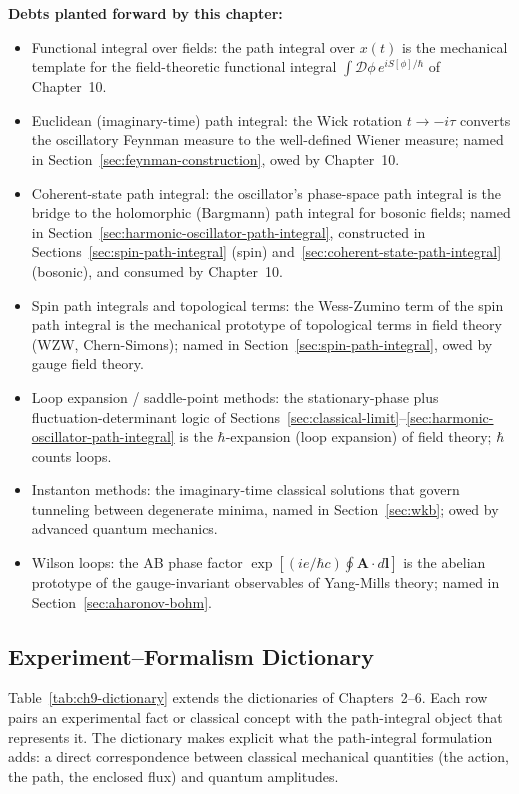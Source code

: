 \medskip\noindent\textbf{Debts planted forward by this chapter:}
\begin{itemize}
\item Functional integral over fields: the path integral over $x(t)$ is the mechanical template for the field-theoretic functional integral $\int\mathcal{D}\phi\,e^{iS[\phi]/\hbar}$ of Chapter~10.
\item Euclidean (imaginary-time) path integral: the Wick rotation $t \to -i\tau$ converts the oscillatory Feynman measure to the well-defined Wiener measure; named in Section~\ref{sec:feynman-construction}, owed by Chapter~10.
\item Coherent-state path integral: the oscillator's phase-space path integral is the bridge to the holomorphic (Bargmann) path integral for bosonic fields; named in Section~\ref{sec:harmonic-oscillator-path-integral}, constructed in Sections~\ref{sec:spin-path-integral} (spin) and~\ref{sec:coherent-state-path-integral} (bosonic), and consumed by Chapter~10.
\item Spin path integrals and topological terms: the Wess-Zumino term of the spin path integral is the mechanical prototype of topological terms in field theory (WZW, Chern-Simons); named in Section~\ref{sec:spin-path-integral}, owed by gauge field theory.
\item Loop expansion / saddle-point methods: the stationary-phase plus fluctuation-determinant logic of Sections~\ref{sec:classical-limit}--\ref{sec:harmonic-oscillator-path-integral} is the $\hbar$-expansion (loop expansion) of field theory; $\hbar$ counts loops.
\item Instanton methods: the imaginary-time classical solutions that govern tunneling between degenerate minima, named in Section~\ref{sec:wkb}; owed by advanced quantum mechanics.
\item Wilson loops: the AB phase factor $\exp[(ie/\hbar c)\oint \bm A\cdot d\bm l]$ is the abelian prototype of the gauge-invariant observables of Yang-Mills theory; named in Section~\ref{sec:aharonov-bohm}.
\end{itemize}

\subsection{Experiment--Formalism Dictionary}

Table~\ref{tab:ch9-dictionary} extends the dictionaries of Chapters~2--6. Each row pairs an experimental fact or classical concept with the path-integral object that represents it. The dictionary makes explicit what the path-integral formulation adds: a direct correspondence between classical mechanical quantities (the action, the path, the enclosed flux) and quantum amplitudes.

